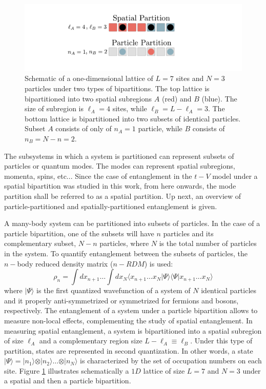 \begin{figure}[h]
\begin{center}
\includegraphics[width=1.0\textwidth]{spatialParticle.pdf}
\end{center}
\caption{Schematic of a one-dimensional lattice of $L=7$ sites and $N=3$ particles under two types of bipartitions. The top lattice is bipartitioned into two spatial subregions $A$ (red) and $B$ (blue). The size of subregion is $\ell_A = 4$ sites, while $\ell_B = L - \ell_A = 3$. The bottom lattice is bipartitioned into two subsets of identical particles. Subset $A$ consists of only of $n_A=1$ particle, while $B$ consists of $n_B = N - n = 2$.}
\label{fig:spatialParticle}
\end{figure}

	
	The subsystems in which a system is partitioned can represent subsets of particles or quantum modes. The modes can represent spatial subregions, momenta, spins, etc... Since the case of entanglement in the $t-V$ model under a spatial bipartition was studied in this work, from here onwards, the mode partition shall be referred to as a spatial partition. Up next, an overview of particle-partitioned and spatially-partitioned entanglement is given.

	
	A many-body system can be partitioned into subsets of particles. In the case of a particle bipartition, one of the subsets will have $n$ particles and its complementary subset, $N-n$ particles, where $N$ is the total number of particles in the system. To quantify entanglement between the subsets of particles, the $n-$body reduced density matrix ($n-RDM$) is used:
	\begin{equation}
	\rho_{n} = \int dx_{n+1} \dots \int dx_N \langle x_{n+1} \dots x_N \vert\Psi\rangle \langle\Psi\vert x_{n+1} \dots x_N \rangle
	\label{eq:nBodyDensityMatrix}
	\end{equation}
	where $\vert\Psi\rangle$ is the first quantized wavefunction of a system of $N$ identical particles and it properly anti-symmetrized or symmetrized for fermions and bosons, respectively.  The entanglement of a system under a particle bipartition allows to measure non-local effects, complementing the study of spatial entanglement. 
	In measuring spatial entanglement, a system is bipartitioned into a spatial subregion of size $\ell_{A}$ and a complementary region size $L - \ell_A \equiv \ell_B$. Under this type of partition, states are represented in second quantization. In other words, a state $\vert\Psi\rangle = \vert n_1 \rangle \otimes \vert n_2 \rangle \dots \otimes \vert n_N \rangle$ is characterized by the set of occupation numbers on each site. Figure \ref{fig:spatialParticle} illustrates schematically a $1D$ lattice of size $L = 7$ and $N = 3$ under a spatial and then a particle bipartition.
	

